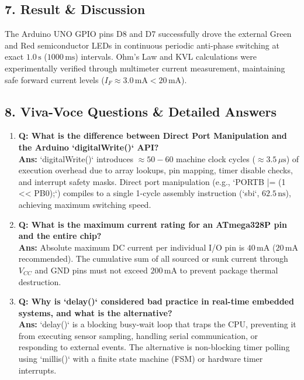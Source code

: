 \documentclass[11pt,a4paper]{article}
\begin{document}
\subsection*{7. Result \& Discussion}
The Arduino UNO GPIO pins D8 and D7 successfully drove the external Green and Red semiconductor LEDs in continuous periodic anti-phase switching at exact $1.0\,\text{s}$ ($1000\,\text{ms}$) intervals. Ohm's Law and KVL calculations were experimentally verified through multimeter current measurement, maintaining safe forward current levels ($I_F \approx 3.0\,\text{mA} < 20\,\text{mA}$).

\subsection*{8. Viva-Voce Questions \& Detailed Answers}
\begin{enumerate}[leftmargin=*]
    \item \textbf{Q: What is the difference between Direct Port Manipulation and the Arduino `digitalWrite()` API?}\\
    \textbf{Ans:} `digitalWrite()` introduces $\approx 50-60$ machine clock cycles ($\approx 3.5\,\mu\text{s}$) of execution overhead due to array lookups, pin mapping, timer disable checks, and interrupt safety masks. Direct port manipulation (e.g., `PORTB |= (1 << PB0);`) compiles to a single 1-cycle assembly instruction (`sbi`, $62.5\,\text{ns}$), achieving maximum switching speed.
    \item \textbf{Q: What is the maximum current rating for an ATmega328P pin and the entire chip?}\\
    \textbf{Ans:} Absolute maximum DC current per individual I/O pin is $40\,\text{mA}$ ($20\,\text{mA}$ recommended). The cumulative sum of all sourced or sunk current through $V_{CC}$ and GND pins must not exceed $200\,\text{mA}$ to prevent package thermal destruction.
    \item \textbf{Q: Why is `delay()` considered bad practice in real-time embedded systems, and what is the alternative?}\\
    \textbf{Ans:} `delay()` is a blocking busy-wait loop that traps the CPU, preventing it from executing sensor sampling, handling serial communication, or responding to external events. The alternative is non-blocking timer polling using `millis()` with a finite state machine (FSM) or hardware timer interrupts.
\end{enumerate}

\newpage
\end{document}
